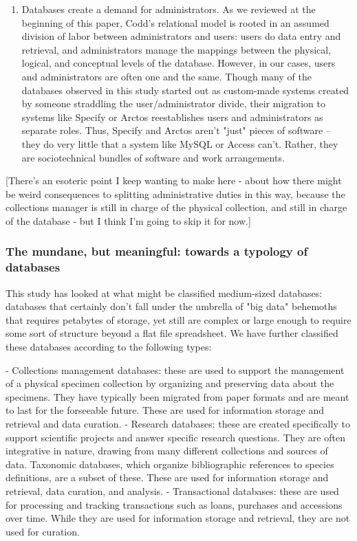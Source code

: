 \begin{enumerate}
\item Databases create a demand for administrators. As we reviewed at the beginning of this paper, Codd’s relational model is rooted in an assumed division of labor between administrators and users: users do data entry and retrieval, and administrators manage the mappings between the physical, logical, and conceptual levels of the database. However, in our cases, users and administrators are often one and the same. Though many of the databases observed in this study started out as custom-made systems created by someone straddling the user/administrator divide, their migration to systems like Specify or Arctos reestablishes users and administrators as separate roles. Thus, Specify and Arctos aren't "just" pieces of software -- they do very little that a system like MySQL or Access can't. Rather, they are sociotechnical bundles of software and work arrangements.
\end{enumerate}

[There's an esoteric point I keep wanting to make here - about how there might be weird consequences to splitting administrative duties in this way, because the collections manager is still in charge of the physical collection, and still in charge of the database - but I think I'm going to skip it for now.]

\subsubsection{The mundane, but meaningful: towards a typology of databases}

This study has looked at what might be classified medium-sized databases: databases that certainly don't fall under the umbrella of "big data" behemoths that requires petabytes of storage, yet still are complex or large enough to require some sort of structure beyond a flat file spreadsheet. We have further classified these databases according to the following types:

- Collections management databases: these are used to support the management of a physical specimen collection by organizing and preserving data about the specimens. They have typically been migrated from paper formats and are meant to last for the forseeable future. These are used for information storage and retrieval and data curation.
- Research databases: these are created specifically to support scientific projects and answer specific research questions. They are often integrative in nature, drawing from many different collections and sources of data. Taxonomic databases, which organize bibliographic references to species definitions, are a subset of these. These are used for information storage and retrieval, data curation, and analysis.
- Transactional databases: these are used for processing and tracking transactions such as loans, purchases and accessions over time. While they are used for information storage and retrieval, they are not used for curation.

